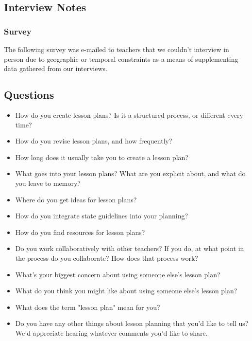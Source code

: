 \documentclass[10pt,letter]{article}
\begin{document}
\subsection{Interview Notes}
\begingroup
\let\section\subsubsection
\label{interview notes}

\endgroup

\section{Survey}
\label{survey}
The following survey was e-mailed to teachers that we couldn't interview in
person due to geographic or temporal constraints as a means of supplementing
data gathered from our interviews.

\subsection{Questions}
\begin{itemize}
\item How do you create lesson plans?  Is it a structured process, or different
      every time?
\item How do you revise lesson plans, and how frequently?
\item How long does it usually take you to create a lesson plan?
\item What goes into your lesson plans?  What are you explicit about, and what
      do you leave to memory?
\item Where do you get ideas for lesson plans?
\item How do you integrate state guidelines into your planning?
\item How do you find resources for lesson plans?
\item Do you work collaboratively with other teachers?  If you do, at what point
      in the process do you collaborate?  How does that process work?
\item What's your biggest concern about using someone else's lesson plan?
\item What do you think you might like about using someone else's lesson plan?
\item What does the term "lesson plan" mean for you?
\item Do you have any other things about lesson planning that you'd like to tell
      us?  We'd appreciate hearing whatever comments you'd like to share.
\end{itemize}
\end{document}
